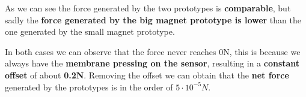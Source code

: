 As we can see the force generated by the two prototypes is \textbf{comparable}, but sadly the \textbf{force generated by the big magnet prototype is lower} than the one generated by the small magnet prototype.

In both cases we can observe that the force never reaches 0N, this is because we always have the \textbf{membrane pressing on the sensor}, resulting in a \textbf{constant offset} of about \textbf{0.2N}.
Removing the offset we can obtain that the \textbf{net force} generated by the prototypes is in the order of \textbf{$5\cdot10^{-5}N$}.